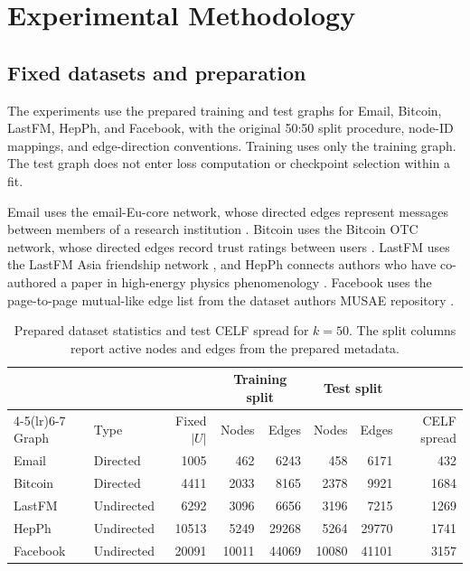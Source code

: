\chapter{Experimental Methodology}\label{ch:design}
\section{Fixed datasets and preparation}
The experiments use the prepared training and test graphs for Email, Bitcoin, LastFM, HepPh, and Facebook, with the original 50:50 split procedure, node-ID mappings, and edge-direction conventions. Training uses only the training graph. The test graph does not enter loss computation or checkpoint selection within a fit.

Email uses the email-Eu-core network, whose directed edges represent messages between members of a research institution \cite{snapemail}. Bitcoin uses the Bitcoin OTC network, whose directed edges record trust ratings between users \cite{snapbitcoin}. LastFM uses the LastFM Asia friendship network \cite{snaplastfm}, and HepPh connects authors who have co-authored a paper in high-energy physics phenomenology \cite{snaphepph}. Facebook uses the page-to-page mutual-like edge list from the dataset authors\textquotesingle{} MUSAE repository \cite{musaefacebook}.

\begin{table}[htbp]
\centering\small
\caption{Prepared dataset statistics and test CELF spread for $k=50$. The split columns report active nodes and edges from the prepared metadata.}\label{tab:datasets}
\begin{tabular}{llrrrrrr}\toprule
 & & & \multicolumn{2}{c}{Training split} & \multicolumn{2}{c}{Test split} & \\
\cmidrule(lr){4-5}\cmidrule(lr){6-7}
Graph & Type & Fixed $|U|$ & Nodes & Edges & Nodes & Edges & CELF spread\\\midrule
Email & Directed & 1005 & 462 & 6243 & 458 & 6171 & 432\\
Bitcoin & Directed & 4411 & 2033 & 8165 & 2378 & 9921 & 1684\\
LastFM & Undirected & 6292 & 3096 & 6656 & 3196 & 7215 & 1269\\
HepPh & Undirected & 10513 & 5249 & 29268 & 5264 & 29770 & 1741\\
Facebook & Undirected & 20091 & 10011 & 44069 & 10080 & 41101 & 3157\\\bottomrule
\end{tabular}
\end{table}

